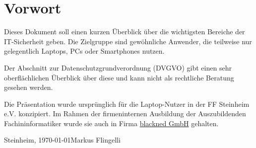 \section*{Vorwort}
Dieses Dokument soll einen kurzen Überblick über die wichtigsten Bereiche der IT-Sicherheit geben. Die Zielgruppe sind gewöhnliche Anwender, die teilweise nur gelegentlich  Laptops, PCs oder Smartphones nutzen.
\vspace{12pt}

Der Abschnitt zur Datenschutzgrundverordnung (DVGVO) gibt einen sehr oberflächlichen Überblick über diese und kann nicht als rechtliche Beratung gesehen werden.
\vspace{12pt}

Die Präsentation wurde ursprünglich für die Laptop-Nutzer in der FF Steinheim e.V. konzipiert. Im Rahmen der firmeninternen Ausbildung der Auszubildenden Fachininformatiker wurde sie auch in Firma \href{https://www.blackned.de}{blackned GmbH} gehalten.
\vspace{24pt}

Steinheim, \today \hfill Markus Flingelli
\newpage
